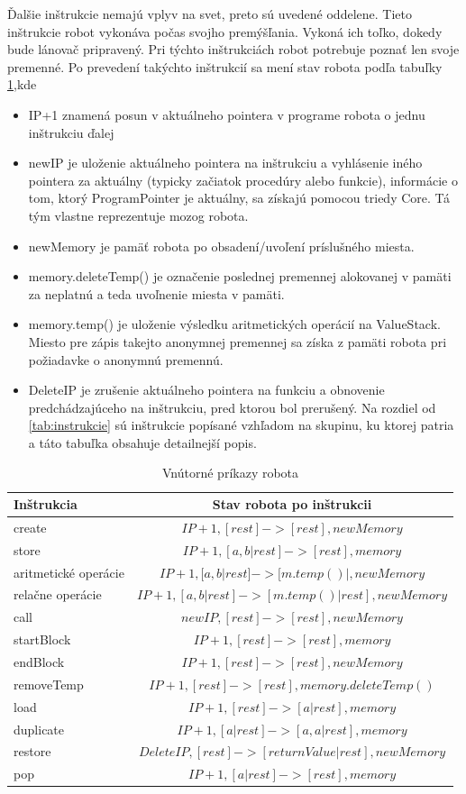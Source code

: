 Ďalšie inštrukcie nemajú vplyv na svet, preto sú uvedené oddelene. Tieto inštrukcie robot vykonáva počas svojho premýšľania. Vykoná ich toľko, dokedy bude lánovač pripravený. Pri týchto inštrukciách robot potrebuje poznať len svoje premenné. Po prevedení takýchto inštrukcií sa mení stav robota podľa tabuľky \ref{VnutroBota},kde
\begin{itemize}
\item IP+1 znamená posun v aktuálneho pointera v programe robota o jednu inštrukciu ďalej
\item newIP je uloženie aktuálneho pointera na inštrukciu a vyhlásenie iného pointera za aktuálny (typicky začiatok procedúry alebo funkcie), informácie o tom, ktorý ProgramPointer je aktuálny, sa získajú pomocou triedy Core. Tá tým vlastne reprezentuje mozog robota.
\item newMemory je pamäť robota po obsadení/uvoľení príslušného miesta.
\item memory.deleteTemp() je označenie poslednej premennej alokovanej v pamäti za neplatnú a teda uvoľnenie miesta v pamäti.
\item memory.temp() je uloženie výsledku aritmetických operácií na ValueStack. Miesto pre zápis takejto anonymnej premennej sa získa z pamäti robota pri požiadavke o anonymnú premennú.
\item DeleteIP je zrušenie aktuálneho pointera na funkciu a obnovenie predchádzajúceho na inštrukciu, pred ktorou bol prerušený. 
Na rozdiel od \ref{tab:instrukcie} sú inštrukcie popísané vzhľadom na skupinu, ku ktorej patria a táto tabuľka obsahuje detailnejší popis.
\end{itemize}

\begin{table}[ht]
\centering
\caption{Vnútorné príkazy robota}
\begin{tabular}{|l|c|}
\hline\hline
Inštrukcia & Stav robota po inštrukcii \\
\hline
create & $ IP+1, [rest]->[rest], newMemory$ \\
store & $ IP+1, [a,b|rest]->[rest], memory$ \\
aritmetické operácie & $IP+1, [a,b|rest]->[m.temp()|, newMemory$ \\
relačne operácie & $IP+1, [a,b|rest]->[m.temp()|rest], newMemory$ \\
call &  $ newIP, [rest]->[rest], newMemory$\\
startBlock & $IP+1, [rest]->[rest], memory$\\
endBlock & $IP+1, [rest]->[rest], newMemory$\\
removeTemp & $IP+1, [rest]->[rest], memory.deleteTemp()$\\
load & $ IP+1, [rest]->[a|rest], memory$\\
duplicate & $ IP+1, [a|rest]->[a,a|rest], memory$\\
restore & $ DeleteIP, [rest]->[returnValue|rest], newMemory$\\
pop & $ IP+1, [a|rest]->[rest], memory$\\
\hline
\end{tabular}
\label{VnutroBota}
\end{table}
